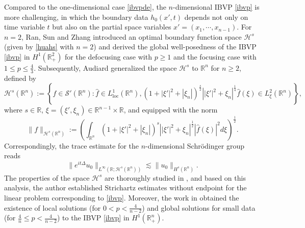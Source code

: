 \documentclass[preprint,compress,12pt]{elsarticle}
\numberwithin{equation}{section}
\begin{document}
	
Compared to the one-dimensional case \eqref{ibvpde}, the $n$-dimensional IBVP \eqref{ibvp} is more challenging, in which the boundary data $h_{0}(x',t)$ depends not only on time variable $t$ but also on the partial space variables $x'=(x_{1},\cdots, x_{n-1})$. For $n=2$, Ran, Sun and Zhang \cite{fallacious} introduced an optimal boundary function space $\mathcal{H}^s$  (given by \eqref{huahs} with $n=2$) and derived the global well-posedness of the IBVP \eqref{ibvp} in $H^{1}(\mathbb{R}_{+}^{2})$ for the defocusing case with $p\geq1$ and the focusing case with $1\leq p\leq \frac{4}{3}$. Subsequently, Audiard \cite{facilitate} generalized the space  $\mathcal{H}^{s}$ to $\mathbb{R}^{n}$ for $n\geq2$, defined by
\begin{equation}\label{huahs}
	\mathcal{H}^s(\mathbb{R}^n):=\left\{f \in \mathscr{S}'(\mathbb{R}^n): \widehat{f}\in L^1_{\mathrm{loc}}(\mathbb{R}^n), \left(1+|\xi'|^2+|\xi_{n}|\right)^{\frac{s}{2}}\left||\xi'|^{2}+\xi_{n}\right|^{\frac{1}{4}}\widehat{f}(\xi)\in L_{\xi}^{2}(\mathbb{R}^n) \right\},
\end{equation}
where $s\in\mathbb{R}$, $\xi=(\xi',\xi_{n})\in \mathbb{R}^{n-1}\times\mathbb{R}$, and equipped with the norm
\begin{equation}\label{blackmail}			\|f\|_{\mathcal{H}^{s}(\mathbb{R}^{n})}:=\left(\int_{\mathbb{R}^{n}}\left(1+|\xi'|^2+|\xi_{n}|\right)^{s}\left||\xi'|^{2}+\xi_{n}\right|^{\frac{1}{2}}|\widehat{f}(\xi)|^{2}d\xi\right)^{\frac{1}{2}}.
\end{equation}
Correspondingly, the trace estimate for the $n$-dimensional Schr\"{o}dinger group reads
\begin{equation}
	\|e^{it\Delta} u_{0}\|_{L^{\infty}(\mathbb{R};\mathcal{H}  ^{s}(\mathbb{R}^{n}))}\lesssim \|u_{0}\|_{H^{s}(\mathbb{R}^{n})}.
\end{equation}
The properties of the space $\mathcal{H}^s$  are thoroughly studied in \cite{facilitate}, and based on this analysis, the author established  Strichartz estimates without endpoint for the linear problem corresponding to \eqref{ibvp}. Moreover, the work in \cite{facilitate} obtained the existence of local solutions (for $0<p<\frac{4}{n-2}$)  and global solutions for small data  (for $\frac{4}{n}\leq p<\frac{4}{n-2}$) to the  IBVP \eqref{ibvp}  in $H^{1}(\mathbb{R}_{+}^{n})$.
\end{document}
